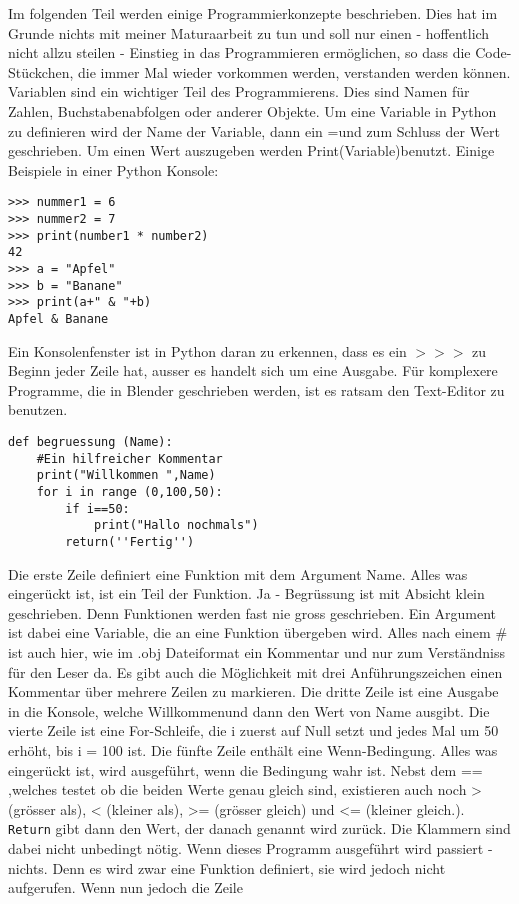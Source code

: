 \documentclass[12pt,twoside]{book}
\begin{document}
Im folgenden Teil werden einige Programmierkonzepte beschrieben.
Dies hat im Grunde nichts mit meiner Maturaarbeit zu tun und soll nur einen - hoffentlich nicht allzu steilen - Einstieg in das Programmieren erm\"oglichen, so dass die Code-St\"uckchen, die immer Mal wieder vorkommen werden, verstanden werden k\"onnen.
\\
Variablen sind ein wichtiger Teil des Programmierens. Dies sind Namen f\"ur Zahlen, Buchstabenabfolgen oder anderer Objekte. Um eine Variable in Python zu definieren wird der Name der Variable, dann ein \glqq =\grqq{ }und zum Schluss der Wert geschrieben. Um einen Wert auszugeben werden \glqq Print(Variable)\grqq{ }benutzt.
Einige Beispiele in einer Python Konsole:
\begin{lstlisting}
>>> nummer1 = 6
>>> nummer2 = 7
>>> print(number1 * number2)
42
>>> a = "Apfel"
>>> b = "Banane"
>>> print(a+" & "+b)
Apfel & Banane
\end{lstlisting}

Ein Konsolenfenster ist in Python daran zu erkennen, dass es ein \glqq \(>>>\)\grqq{ } zu Beginn jeder Zeile hat, ausser es handelt sich um eine Ausgabe.
F\"ur komplexere Programme, die in Blender geschrieben werden, ist es ratsam den Text-Editor zu benutzen. 

\begin{lstlisting}
def begruessung (Name):  	   
	#Ein hilfreicher Kommentar  
	print("Willkommen ",Name)  
	for i in range (0,100,50):
		if i==50:
			print("Hallo nochmals")
		return(''Fertig'')
\end{lstlisting}

Die erste Zeile definiert eine Funktion mit dem Argument \glqq Name\grqq. Alles was einger\"uckt ist, ist ein Teil der Funktion.
Ja - Begr\"ussung ist mit Absicht klein geschrieben. Denn Funktionen werden fast nie gross geschrieben.
Ein Argument ist dabei eine Variable, die an eine Funktion \"ubergeben wird.
Alles nach einem \# ist auch hier, wie im .obj Dateiformat ein Kommentar und nur zum Verst\"andniss f\"ur den Leser da.
Es gibt auch die M\"oglichkeit mit drei Anf\"uhrungszeichen einen Kommentar \"uber mehrere Zeilen zu markieren.
Die dritte Zeile ist eine Ausgabe in die Konsole, welche \glqq Willkommen\grqq{ }und dann den Wert von Name ausgibt.
Die vierte Zeile ist eine For-Schleife, die i zuerst auf Null setzt und jedes Mal um 50 erh\"oht, bis i = 100 ist.
Die f\"unfte Zeile enth\"alt eine Wenn-Bedingung. Alles was einger\"uckt ist, wird ausgef\"uhrt, wenn die Bedingung wahr ist. 
Nebst dem == ,welches testet ob die beiden Werte genau gleich sind, existieren auch noch > (gr\"osser als), < (kleiner als), >= (gr\"osser gleich) und <= (kleiner gleich.).
\texttt{Return} gibt dann den Wert, der danach genannt wird zur\"uck. Die Klammern sind dabei nicht unbedingt n\"otig.
Wenn dieses Programm ausgef\"uhrt wird passiert - nichts.
Denn es wird zwar eine Funktion definiert, sie wird jedoch nicht aufgerufen. Wenn nun jedoch die Zeile
\end{document}
